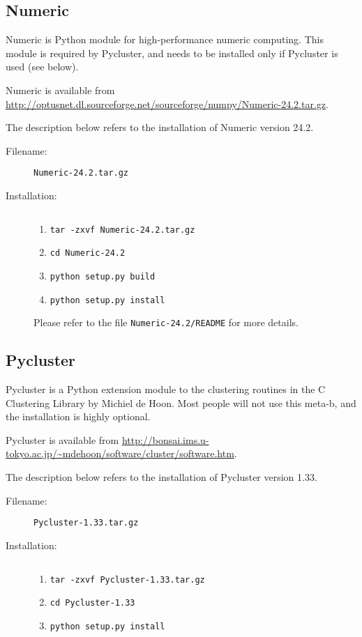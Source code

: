 \subsection{Numeric}

Numeric is Python module for high-performance numeric computing.
This module is required by Pycluster, and needs to be installed
only if Pycluster is used (see below).

Numeric is available from
\url{http://optusnet.dl.sourceforge.net/sourceforge/numpy/Numeric-24.2.tar.gz}.

The description below refers to the installation of Numeric version
24.2.

\begin{description}
\item [Filename:] {\tt Numeric-24.2.tar.gz}
\item [Installation:] $ $
  \begin{enumerate}
  \item {\tt tar -zxvf Numeric-24.2.tar.gz}
  \item {\tt cd Numeric-24.2}
  \item {\tt python setup.py build}
  \item {\tt python setup.py install}
  \end{enumerate}
Please refer to the file {\tt Numeric-24.2/README} for more
details.
\end{description}

\subsection{Pycluster}

Pycluster is a Python extension module to the clustering routines
in the C Clustering Library by Michiel de Hoon.  Most people will
not use this meta-b, and the installation is highly optional. 

Pycluster is available from
\url{http://bonsai.ims.u-tokyo.ac.jp/~mdehoon/software/cluster/software.htm}.

The description below refers to the installation of Pycluster version
1.33.

\begin{description}
\item [Filename:] {\tt Pycluster-1.33.tar.gz}
\item [Installation:] $ $
  \begin{enumerate}
  \item {\tt tar -zxvf Pycluster-1.33.tar.gz}
  \item {\tt cd Pycluster-1.33}
  \item {\tt python setup.py install}
  \end{enumerate}
\end{description}

